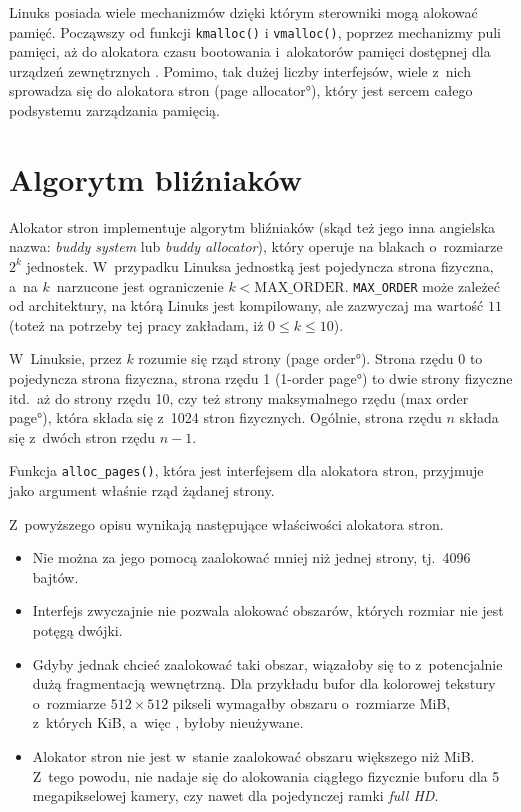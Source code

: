 Linuks posiada wiele mechanizmów dzięki którym sterowniki mogą
alokować pamięć.  Począwszy od funkcji \lstinline|kmalloc()|
i \lstinline|vmalloc()|, poprzez mechanizmy puli pamięci, aż do
alokatora czasu bootowania i~alokatorów pamięci dostępnej dla urządzeń
zewnętrznych \cite[rozdział 8]{bib:ldd3}.  Pomimo, tak dużej liczby
interfejsów, wiele z~nich sprowadza się do alokatora stron (\ang{page
  allocator}), który jest sercem całego podsystemu zarządzania
pamięcią.

\section{Algorytm bliźniaków}

Alokator stron implementuje algorytm bliźniaków (skąd też jego inna
angielska nazwa: {\it buddy system} lub {\it buddy allocator}), który
operuje na blakach o~rozmiarze $2^k$ jednostek.  W~przypadku Linuksa
jednostką jest pojedyncza strona fizyczna, a~na $k$~narzucone jest
ograniczenie $k < \mathrm{MAX\_ORDER}$.  \lstinline|MAX_ORDER| może
zależeć od architektury, na którą Linuks jest kompilowany, ale
zazwyczaj ma wartość $11$ (toteż na potrzeby tej pracy zakładam, iż $0
\le k \le 10$).

W~Linuksie, przez $k$ rozumie się rząd strony (\ang{page order}).
Strona rzędu 0 to pojedyncza strona fizyczna, strona rzędu 1
(\ang{1-order page}) to dwie strony fizyczne itd.\ aż do strony rzędu
10, czy też strony maksymalnego rzędu (\ang{max order page}), która
składa się z~1024 stron fizycznych.  Ogólnie, strona rzędu $n$ składa
się z~dwóch stron rzędu $n-1$.

Funkcja \lstinline|alloc_pages()|, która jest interfejsem dla
alokatora stron, przyjmuje jako argument właśnie rząd żądanej strony.

Z~powyższego opisu wynikają następujące właściwości alokatora stron.

\begin{itemize}
\item Nie można za jego pomocą zaalokować mniej niż jednej strony,
  tj.\ 4096 bajtów.
\item Interfejs zwyczajnie nie pozwala alokować obszarów, których
  rozmiar nie jest potęgą dwójki.
\item Gdyby jednak chcieć zaalokować taki obszar, wiązałoby się to
  z~potencjalnie dużą fragmentacją wewnętrzną.  Dla przykładu bufor
  dla kolorowej tekstury o~rozmiarze $512 \times 512$ pikseli
  wymagałby obszaru o~rozmiarze \unit[1]{MiB}, z~których
  \unit[256]{KiB}, a~więc , byłoby nieużywane.
\item Alokator stron nie jest w~stanie zaalokować obszaru większego
  niż \unit[4]{MiB}.  Z~tego powodu, nie nadaje się do alokowania
  ciągłego fizycznie buforu dla 5 megapikselowej kamery, czy nawet dla
  pojedynczej ramki {\it full HD}.
\end{itemize}

